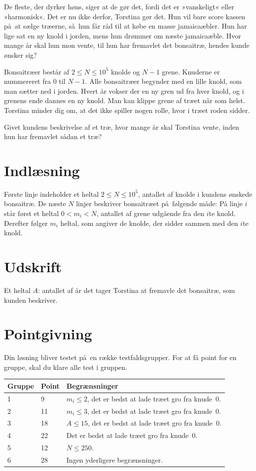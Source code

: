 
De fleste, der dyrker høns, siger at de gør det, fordi det er »vanskeligt« eller »harmonisk«.
Det er nu ikke derfor, Torstina gør det.
Hun vil bare score kassen på at sælge træerne, så hun får råd til at købe en masse jamaicaæbler.
Hun har lige sat en ny knold i jorden, mens hun drømmer om næste jamaicaæble.
Hvor mange år skal hun mon vente, til hun har fremavlet det bonsaitræ, hendes kunde ønsker sig?

Bonsaitræer består af $2\leq N \leq 10^5$ knolde og $N-1$ grene.
Knuderne er nummereret fra $0$ til $N-1$. 
Alle bonsaitræer begynder med en lille knold, som man sætter ned i jorden.
Hvert år vokser der en ny gren ud fra hver knold, og i grenens ende dannes en ny knold.
Man kan klippe grene af træet når som helst. 
Torstina minder dig om, at det ikke spiller nogen rolle, hvor i træet roden sidder.

Givet kundens beskrivelse af et træ, hvor mange år skal Torstina vente, inden hun har fremavlet sådan et træ?

\section*{Indlæsning}

Første linje indeholder et heltal $2\leq N\leq 10^5$, antallet af knolde i kundens ønskede bonsaitræ.
De næste $N$ linjer beskriver bonsaitræet på følgende måde:
På linje $i$ står først et heltal $0 < m_i < N$, antallet af grene udgående fra den $i$te knold. 
Derefter følger $m_i$ heltal, som angiver de knolde, der sidder sammen med den $i$te knold.

\section*{Udskrift}
Et heltal $A$: antallet af år det tager Torstina at fremavle det bonsaitræ, som kunden beskriver.

\section*{Pointgivning}

Din løsning bliver testet på en række testfaldsgrupper.
For at få point for en gruppe, skal du klare alle test i gruppen. 

\noindent
\begin{tabular}{| l | l | l |}
\hline
Gruppe & Point      & Begrænsninger \\ \hline
1      &  9         & $m_i\leq 2$, det er bedst at lade træet gro fra knude~0.\\ \hline
2      & 11         & $m_i \leq 3$, det er bedst at lade træet gro fra knude~0. \\ \hline
3      & 18         & $A \leq 15$, det er bedst at lade træet gro fra knude~0. \\ \hline
4      & 22         & Det er bedst at lade træet gro fra knude~0. \\ \hline
5      & 12         & $N \leq 250$. \\ \hline
6      & 28         & Ingen yderligere begrænsninger. \\ \hline
\end{tabular}

